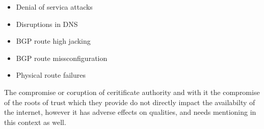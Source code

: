 \documentclass[../eva1_scion.tex]{subfiles}
\begin{document}
\begin{itemize}
    \item Denial of servica attacks
    \item Disruptions in DNS
    \item BGP route high jacking
    \item BGP route missconfiguration
    \item Physical route failures
\end{itemize}

The compromise or coruption of ceritificate authority and with it the compromise of the roots of trust which they provide do not directly impact the availabilty of the internet, however it has adverse effects on qualities, and needs mentioning in this context as well.

\
\end{document}
